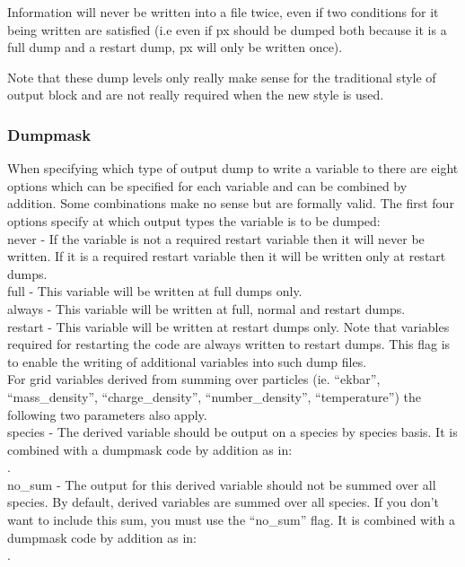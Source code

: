 Information will never be written into a file twice, even if two conditions for
it being written are satisfied (i.e even if px should be dumped both because it
is a full dump and a restart dump, px will only be written once).

Note that these dump levels only really make sense for the traditional style
of output block and are not really required when the new style is used.

\subsubsection{Dumpmask}
When specifying which type of output dump to write a variable to there are
eight options which can be specified for each variable and can be combined by
addition. Some combinations make no sense but are formally
valid. The first four options specify at which output types the variable
is to be dumped:\\

{\emphtext never} - If the variable is not a required restart variable then it
will never be written. If it is a required restart variable then it will be
written only at restart dumps.\\

{\emphtext full} - This variable will be written at full dumps only.\\

{\emphtext always} - This variable will be written at full, normal and restart
dumps.\\

{\emphtext restart} - This variable will be written at restart dumps only.
Note that variables required for restarting the code are always written to
restart dumps. This flag is to enable the writing of additional variables
into such dump files.\\

For grid variables derived from summing over particles (ie. ``ekbar'',
``mass\_density'', ``charge\_density'', ``number\_density'', ``temperature'')
the following two parameters also apply.\\

{\emphtext species} - The derived variable should be output on a
species by species basis. It is combined with a dumpmask code
by addition as in:\\
\indent{}.\\

{\emphtext no\_sum} - The output for this derived variable should not
be summed over all species. By default, derived variables are summed over
all species. If you don't want to include this sum, you must use
the ``no\_sum'' flag. It is combined with a dumpmask code
by addition as in:\\
\indent{}.\\


